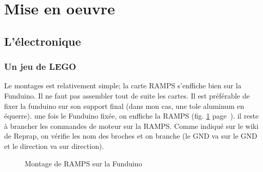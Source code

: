 \section{Mise en oeuvre}%
\subsection{L'électronique}%
\subsubsection{Un jeu de LEGO}
Le montages est relativement simple; la carte RAMPS s'enffiche bien sur la Funduino. %
Il ne faut pas  assembler tout de suite les cartes. Il est préférable de fixer la %
funduino sur son support final (dans mon cas, une tole aluminum en équerre). une fois %
le Funduino fixée, on enffiche  la RAMPS (fig. \ref{montage_carte} %
page~\pageref{montage_carte}). il reste à brancher les commandes de moteur %
sur la RAMPS. Comme indiqué sur le wiki de Reprap, on vérifie les nom des broches et %
on branche (le GND va sur le GND et le direction va sur direction).%
\begin{figure}%
   \caption{\label{montage_carte} Montage de RAMPS sur la Funduino}%
\end{figure}%
